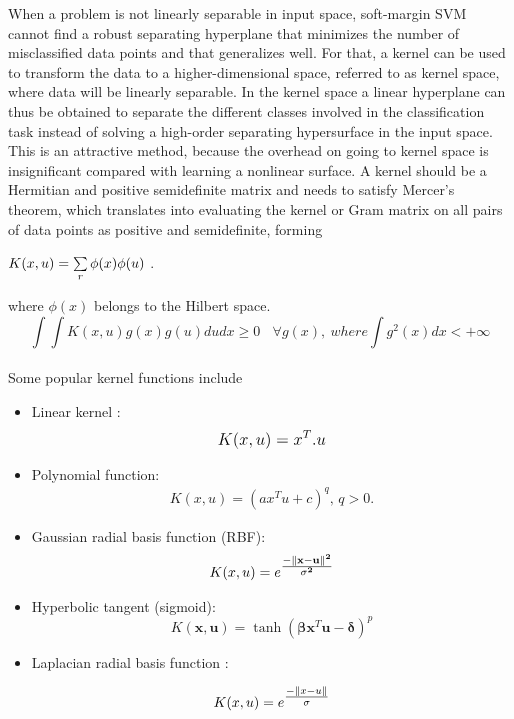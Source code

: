 When a problem is not linearly separable in input space, soft-margin SVM cannot find a robust separating
hyperplane that minimizes the number of misclassified data points and that generalizes well. For that, a kernel can be used to transform the data to a higher-dimensional space, referred to as kernel space, where data will be linearly separable. In the kernel space a linear hyperplane can thus be obtained to separate the different classes involved in the classification task instead of solving a high-order separating hypersurface in the input space. This is an attractive method, because the overhead on going to kernel space is insignificant compared with learning a nonlinear surface. A kernel should be a Hermitian and positive semidefinite matrix and needs to satisfy Mercer’s theorem, which translates into evaluating the kernel or Gram matrix on all pairs of data points as positive and semidefinite, forming

$K(\small{x,u})=\sum\limits_{r} \phi(x)\phi(u) $ .

where $\phi(x) $ belongs to the Hilbert space.
\newline
$$\int \int K(x,u) g(x) g(u) du dx \geq 0 \ \ \ \ \forall g(x) , \ where \int g^2(x) dx < +\infty$$
\\
\newline 
Some popular kernel functions include


\begin{itemize}

  \item  Linear kernel  : 
  \begin{align*}
  \mathlarger {K(x,u)=  x^{T}.u  }
   \end{align*}
  \item Polynomial function: 
  \begin{align*}
  K(x,u)=(ax^{T}u + c)^{q} ,\, q>0.
  \end{align*}
  \item Gaussian radial basis function (RBF): 
\begin{align*} 
 K(x,u) = e^{\mathlarger{\frac{\mathbf{-\| x -  u\|^2}}{\mathbf{\sigma^2} } }}
\end{align*}
   
  \item  Hyperbolic tangent (sigmoid):
    \begin{equation}
      K(\mathbf x, \mathbf u) = \tanh(\mathbf {\beta} \mathbf x^{T} \mathbf u - \mathbf{\delta})^p
    \end{equation}
    
    \item Laplacian radial basis function : 
    
    \begin{align*} 
      K(x,u) = e^{\mathlarger{\frac{-\| x -  u\|}{\sigma} } }
     \end{align*}
    
\end{itemize}

